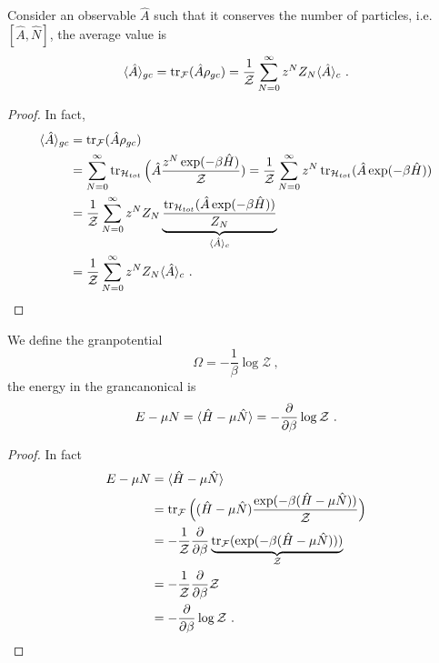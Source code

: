     Consider an observable $\hat A$ such that it conserves the number of particles, i.e. $[\hat A, \hat N]$, the average value is 
    \begin{equation*}
        \langle\hat A\rangle_{gc} = \operatorname{tr}_{\mathcal F} (\hat A \rho_{gc}) = \frac{1}{\mathcal Z} \sum_{N=0}^{\infty} z^N Z_N \langle\hat A\rangle_c ~.
    \end{equation*}
    \begin{proof}
        In fact, 
        \begin{equation*}
        \begin{aligned}
            \langle\hat A\rangle_{gc} & = \operatorname{tr}_{\mathcal F} (\hat A \rho_{gc}) \\ & = \sum_{N=0}^{\infty} \operatorname{tr}_{\mathcal H_{tot}} \Big (\hat A \frac{z^N \exp(- \beta \hat H)}{\mathcal Z}) = \frac{1}{\mathcal Z} \sum_{N=0}^{\infty} z^N \operatorname{tr}_{\mathcal H_{tot}} (\hat A \exp(- \beta \hat H)) \\ & = \frac{1}{\mathcal Z} \sum_{N=0}^{\infty} z^N Z_N \underbrace{\frac{\operatorname{tr}_{\mathcal H_{tot}} (\hat A \exp(- \beta \hat H))}{Z_N}}_{\langle\hat A\rangle_c} \\ & = \frac{1}{\mathcal Z} \sum_{N=0}^{\infty} z^N Z_N \langle\hat A\rangle_c ~.
        \end{aligned}
        \end{equation*}
    \end{proof}
    
    We define the granpotential 
    \begin{equation*}
        \Omega = - \frac{1}{\beta} \log \mathcal Z ~,
    \end{equation*}
    the energy in the grancanonical is 
    \begin{equation*}
        E - \mu N = \langle\hat H - \mu \hat N\rangle = - \frac{\partial}{\partial\beta} \log \mathcal Z ~.
    \end{equation*}
    \begin{proof}
        In fact 
        \begin{equation*}
        \begin{aligned}
            E - \mu N & = \langle\hat H - \mu \hat N\rangle \\ & = \operatorname{tr}_{\mathcal F} \Big ( (\hat H - \mu \hat N) \frac{\exp( - \beta (\hat H - \mu \hat N))}{\mathcal Z} \Big) \\ & = - \frac{1}{\mathcal Z} \frac{\partial}{\partial\beta} \underbrace{\operatorname{tr}_{\mathcal F} (\exp(- \beta (\hat H - \mu \hat N)))}_{\mathcal Z} \\ & = - \frac{1}{\mathcal Z} \frac{\partial}{\partial\beta} \mathcal Z \\ & = - \frac{\partial}{\partial\beta} \log \mathcal Z ~.
        \end{aligned}
        \end{equation*}
    \end{proof}

